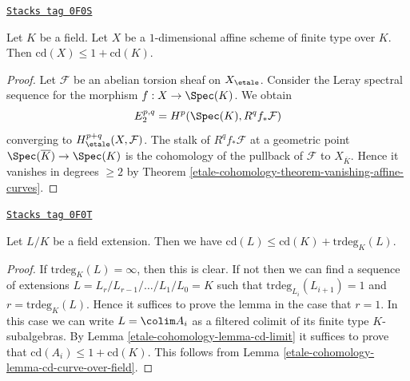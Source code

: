 \begin{lemma}
\label{etale-cohomology-lemma-cd-curve-over-field}
\href{https://stacks.math.columbia.edu/tag/0F0S}{\texttt{Stacks tag 0F0S}}

Let $K$ be a field. Let $X$ be a $1$-dimensional
affine scheme of finite type over $K$. Then
$\text{cd}(X) \leq 1 + \text{cd}(K)$.
\end{lemma}

\begin{proof}
Let $\mathcal{F}$ be an abelian torsion sheaf on $X_\etale$.
Consider the Leray spectral sequence for the morphism
$f : X \to \Spec(K)$. We obtain
$$
E_2^{p, q} = H^p(\Spec(K), R^qf_*\mathcal{F})
$$
converging to $H^{p + q}_\etale(X, \mathcal{F})$.
The stalk of $R^qf_*\mathcal{F}$ at a geometric point
$\Spec(\overline{K}) \to \Spec(K)$ is the cohomology of the
pullback of $\mathcal{F}$ to $X_{\overline{K}}$.
Hence it vanishes in degrees $\geq 2$ by
Theorem \ref{etale-cohomology-theorem-vanishing-affine-curves}.
\end{proof}

\begin{lemma}
\label{etale-cohomology-lemma-cd-field-extension}
\href{https://stacks.math.columbia.edu/tag/0F0T}{\texttt{Stacks tag 0F0T}}

Let $L/K$ be a field extension. Then we have
$\text{cd}(L) \leq \text{cd}(K) + \text{trdeg}_K(L)$.
\end{lemma}

\begin{proof}
If $\text{trdeg}_K(L) = \infty$, then this is clear.
If not then we can find a sequence of extensions
$L= L_r/L_{r - 1}/ \ldots /L_1/L_0 = K$ such that
$\text{trdeg}_{L_i}(L_{i + 1}) = 1$ and $r = \text{trdeg}_K(L)$.
Hence it suffices to prove the lemma in the case that $r = 1$.
In this case we can write $L = \colim A_i$
as a filtered colimit of its finite type $K$-subalgebras.
By Lemma \ref{etale-cohomology-lemma-cd-limit} it suffices to prove that
$\text{cd}(A_i) \leq 1 + \text{cd}(K)$. This follows
from Lemma \ref{etale-cohomology-lemma-cd-curve-over-field}.
\end{proof}


